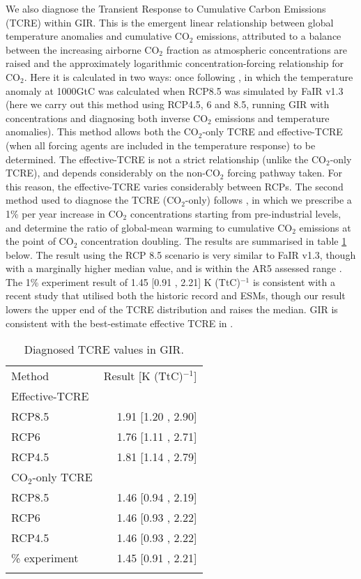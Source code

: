 \documentclass[gmd, manuscript]{copernicus}
\begin{document}
We also diagnose the Transient Response to Cumulative Carbon Emissions (TCRE) within GIR. This is the emergent linear relationship between global temperature anomalies and cumulative CO$_2$ emissions, attributed to a balance between the increasing airborne CO$_2$ fraction as atmospheric concentrations are raised and the approximately logarithmic concentration-forcing relationship for CO$_2$. Here it is calculated in two ways: once following \citeauthor{Smith2017}, in which the temperature anomaly at 1000GtC was calculated when RCP8.5 was simulated by FaIR v1.3 (here we carry out this method using RCP4.5, 6 and 8.5, running GIR with concentrations and diagnosing both inverse CO$_2$ emissions and temperature anomalies). This method allows both the CO$_2$-only TCRE and effective-TCRE (when all forcing agents are included in the temperature response) to be determined. The effective-TCRE is not a strict relationship (unlike the CO$_2$-only TCRE), and depends considerably on the non-CO$_2$ forcing pathway taken. For this reason, the effective-TCRE varies considerably between RCPs. The second method used to diagnose the TCRE (CO$_2$-only) follows \cite{Gillett2013}, in which we prescribe a 1\% per year increase in CO$_2$ concentrations starting from pre-industrial levels, and determine the ratio of global-mean warming to cumulative CO$_2$ emissions at the point of CO$_2$ concentration doubling. The results are summarised in table \ref{tab:TCREresults} below. The result using the RCP 8.5 scenario is very similar to FaIR v1.3, though with a marginally higher median value, and is within the AR5 assessed range \citep{Collins2013}. The 1\% experiment result of 1.45 [0.91 , 2.21] K (TtC)$^{-1}$ is consistent with a recent study \citep{Millar20160449} that utilised both the historic record and ESMs, though our result lowers the upper end of the TCRE distribution and raises the median. GIR is consistent with the best-estimate effective TCRE in \citeauthor{Millar20160449}.

\begin{table}[t]
    \caption{Diagnosed TCRE values in GIR.} \label{tab:TCREresults}
    \begin{tabular}{l r}
    \tophline
        Method & Result [K (TtC)$^{-1}$]\\
    \middlehline
        Effective-TCRE & \\
        RCP8.5 & 1.91 [1.20 , 2.90]\\
        RCP6 & 1.76 [1.11 , 2.71]\\
        RCP4.5 & 1.81 [1.14 , 2.79]\\
    \middlehline
        CO$_2$-only TCRE & \\
        RCP8.5 & 1.46 [0.94 , 2.19]\\
        RCP6 & 1.46 [0.93 , 2.22]\\
        RCP4.5 & 1.46 [0.93 , 2.22]\\
    \middlehline
        1\% experiment & 1.45 [0.91 , 2.21]\\
    \bottomhline
    \end{tabular}
    \belowtable{} %
\end{table}
\end{document}

